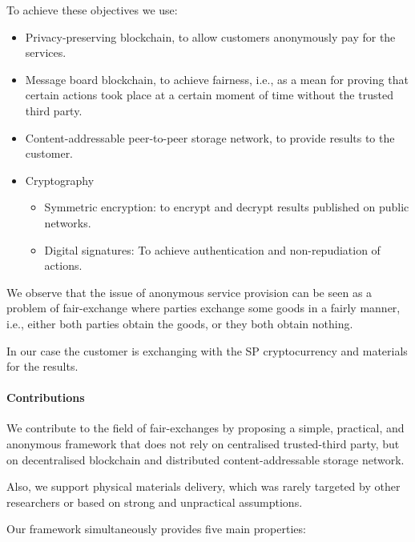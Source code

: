 \documentclass{ieeeaccess}
\begin{document}
To achieve these objectives we use:
\begin{itemize}
    \item Privacy-preserving blockchain, to allow customers anonymously pay for the services.
    \item Message board blockchain, to achieve fairness, i.e., as a mean for proving that certain actions took place at a certain moment of time without the trusted third party.
    \item Content-addressable peer-to-peer storage network, to provide results to the customer. 
    \item Cryptography
    \begin{itemize}
        \item Symmetric encryption: to encrypt and decrypt results published on public networks.
        \item Digital signatures: To achieve authentication and non-repudiation of actions. 
    \end{itemize}
    
\end{itemize}

We observe that the issue of anonymous service provision can be seen as a problem of fair-exchange where parties exchange some goods in a fairly manner, i.e., either both parties obtain the goods, or they both obtain nothing.

In our case the customer is exchanging with the SP cryptocurrency and materials for the results.

\paragraph{Contributions}
We contribute to the field of fair-exchanges by proposing a simple,
practical, and anonymous framework that does not rely on centralised trusted-third party, but on decentralised blockchain and
distributed content-addressable storage network.

Also, we support physical materials delivery, which was rarely targeted by other researchers or based on strong and unpractical assumptions.

Our framework simultaneously provides five main properties:
\end{document}
